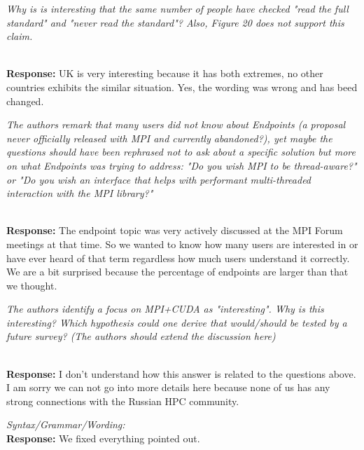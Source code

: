 \documentclass[11pt]{article}
\newcommand{\response}[2]{{\vspace{5mm}\noindent{\bf Comment:} \em #1}\\%
  {\bf Response:} #2}
\newcommand{\iresponse}[2]{{\item \em #1}\\%
  {\bf Response:} #2}
\begin{document}
\begin{enumerate}
\iresponse{Why is is interesting that the same number of people have
  checked "read the full standard" and "never read the standard"?
  Also, Figure 20 does not support this claim.}
{UK is very interesting because it has both extremes, no other
  countries exhibits the similar situation. Yes, the wording was wrong
and has beed changed.}

\iresponse{The authors remark that many users did not know about
  Endpoints (a proposal never officially released with MPI and
  currently abandoned?), yet maybe the questions should have been
  rephrased not to ask about a specific solution but more on what
  Endpoints was trying to address: "Do you wish MPI to be
  thread-aware?" or "Do you wish an interface that helps with
  performant multi-threaded interaction with the MPI library?"}
{The endpoint topic was very actively discussed at the MPI Forum
  meetings at that time. So we wanted to know how many users are
  interested in or have ever heard of that term regardless how much
  users understand it correctly. We are a bit
  surprised because the percentage of endpoints are larger than that
  we thought. }

\iresponse{The authors identify a focus on MPI+CUDA as
  "interesting". Why is this interesting? Which hypothesis could one
  derive that would/should be tested by a future survey? (The authors
  should extend the discussion here)}
{I don't understand how this answer is related to the questions above. I am sorry we can not go into more details here because none of us
  has any strong connections with the Russian HPC community. }

\end{enumerate}

\response{Syntax/Grammar/Wording:}
{We fixed everything pointed out.}
\end{document}
